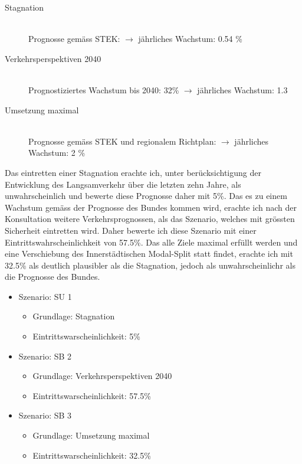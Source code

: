 \begin{description}
\item[Stagnation] \hfill \\
Prognosse gemäss STEK: $\rightarrow$ jährliches Wachstum: 0.54 \% 
\item[Verkehrsperspektiven 2040] \hfill \\
Prognostiziertes Wachstum bis 2040: 32\% $\rightarrow$ jährliches Wachstum: 1.3 
\item[Umsetzung maximal] \hfill \\
Prognosse gemäss STEK und regionalem Richtplan: $\rightarrow$ jährliches Wachstum: 2 \% 
\end{description}

Das eintretten einer Stagnation erachte ich, unter berücksichtigung der Entwicklung des Langsamverkehr über die letzten zehn Jahre, als unwahrscheinlich und bewerte diese Prognosse daher mit 5\%.
Das es zu einem Wachstum gemäss der Prognosse des Bundes kommen wird, erachte ich nach der Konsultation weitere Verkehrsprognossen, als das Szenario, welches mit grössten Sicherheit eintretten wird. Daher bewerte ich diese Szenario mit einer Eintrittswahrscheinlichkeit von 57.5\%. 
Das alle Ziele maximal erfüllt werden und eine Verschiebung des Innerstädtischen Modal-Split statt findet, erachte ich mit 32.5\% als deutlich plausibler als die Stagnation, jedoch als unwahrscheinlichr als die Prognosse des Bundes. 

\begin{itemize}
\item Szenario: SU 1
	\begin{itemize}
	\item Grundlage: Stagnation 
	\item Eintrittswarscheinlichkeit: 5\%
	\end{itemize}
\item Szenario: SB 2
	\begin{itemize}
	\item Grundlage: Verkehrsperspektiven 2040
	\item Eintrittswarscheinlichkeit: 57.5\%
	\end{itemize}
\item Szenario: SB 3
	\begin{itemize}
	\item Grundlage: Umsetzung maximal
	\item Eintrittswarscheinlichkeit: 32.5\%
	\end{itemize}
\end{itemize}

